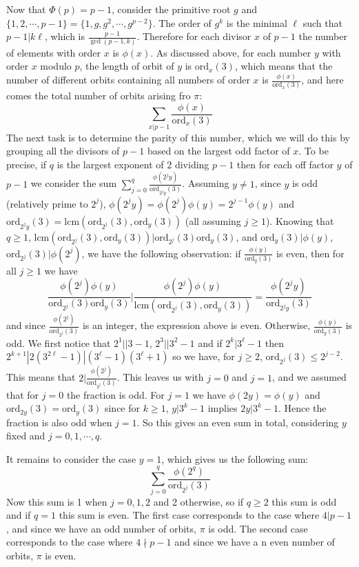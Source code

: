 \documentclass[11pt,a4paper]{article}
\newcommand{\<}{\langle}
\renewcommand{\>}{\rangle}
\newcommand{\ord}{\mathrm{ord}}
\newcommand{\lcm}{\mathrm{lcm}}
\begin{document}
\begin{enumerate}
	Now that $\Phi(p)=p-1$, consider the primitive root $g$ and $\{1, 2, \cdots , p-1\}=\{1, g, g^2, \cdots , g^{p-2}\}$. The order of $g^k$ is the minimal $\ell$ such that $p-1|k\ell$, which is $\frac{p-1}{\gcd(p-1, k)}$. Therefore for each divisor $x$ of $p-1$ the number of elements with order $x$ is $\phi(x)$. As discussed above, for each number $y$ with order $x$ modulo $p$, the length of orbit of $y$ is $\ord_x(3)$, which means that the number of different orbits containing all numbers of order $x$ is $\frac{\phi(x)}{\ord_x(3)}$, and here comes the total number of orbits arising fro $\pi$: 
	\[\sum_{x|p-1} \frac{\phi(x)}{\ord_x(3)}\]
	The next task is to determine the parity of this number, which we will do this by grouping all the divisors of $p-1$ based on the largest odd factor of $x$. To be precise, if $q$ is the largest exponent of 2 dividing $p-1$ then for each off factor $y$ of $p-1$ we consider the sum $\sum_{j=0}^q \frac{\phi(2^j y)}{\ord_{2^j y}(3)}$. Assuming $y\neq 1$, since $y$ is odd (relatively prime to $2^j$), $\phi(2^j y)=\phi(2^j)\phi(y)=2^{j-1}\phi(y)$ and $\ord_{2^j y}(3)=\lcm(\ord_{2^j}(3), \ord_{y}(3))$ (all assuming $j\ge 1$). Knowing that $q\ge 1$, $\lcm(\ord_{2^j}(3), \ord_{y}(3))|\ord_{2^j}(3)\ord_{y}(3)$, and $\ord_{y}(3)|\phi(y)$, $\ord_{2^j}(3)|\phi(2^j)$, we have the following observation: if $\frac{\phi(y)}{\ord_{y}(3)}$ is even, then for all $j\ge 1$ we have  
	\[\frac{\phi(2^j)\phi(y)}{\ord_{2^j}(3)\ord_{y}(3)}|\frac{\phi(2^j)\phi(y)}{\lcm(\ord_{2^j}(3), \ord_{y}(3))}=\frac{\phi(2^j y)}{\ord_{2^j y}(3)}\]
	and since $\frac{\phi(2^j)}{\ord_{2^j}(3)}$ is an integer, the expression above is even. Otherwise, $\frac{\phi(y)}{\ord_{y}(3)}$ is odd. We first notice that $2^1||3-1$, $2^3||3^2-1$ and if $2^k|3^{\ell}-1$ then $2^{k+1}|2(3^{2\ell}-1)|(3^{\ell}-1)(3^{\ell}+1)$ so we have, for $j\ge 2$, $\ord_{2^j} (3)\le 2^{j-2}$. This means that $2|\frac{\phi(2^j)}{\ord_{2^j} (3)}$. This leaves us with $j=0$ and $j=1$, and we assumed that for $j=0$ the fraction is odd. For $j=1$ we have $\phi(2y)=\phi(y)$ and $\ord_{2y}(3)=\ord_{y}(3)$ since for $k\ge 1$, $y|3^k-1$ implies $2y|3^k-1$. Hence the fraction is also odd when $j=1$. So this gives an even sum in total, considering $y$ fixed and $j=0, 1, \cdots , q$. 
	
	It remains to consider the case $y=1$, which gives us the following sum: 
	\[\sum_{j=0}^{q}\frac{\phi(2^q)}{\ord_{2^j}(3)}\]
	Now this sum is 1 when $j=0, 1, 2$ and 2 otherwise, so if $q\ge 2$ this sum is odd and if $q=1$ this sum is even. The first case corresponds to the case where $4|p-1$, and since we have an odd number of orbits, $\pi$ is odd. The second case corresponds to the case where $4\nmid p-1$ and since we have a n even number of orbits, $\pi$ is even. 
	

\end{enumerate}
\end{document}
